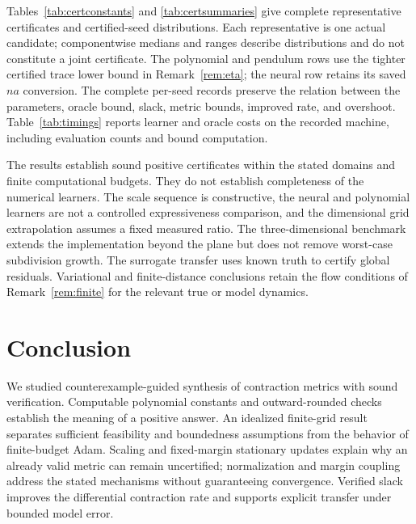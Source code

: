 \documentclass[12pt,onecolumn,journal]{IEEEtran}
\begin{document}
Tables~\ref{tab:certconstants} and \ref{tab:certsummaries} give complete representative certificates and certified-seed distributions. Each representative is one actual candidate; componentwise medians and ranges describe distributions and do not constitute a joint certificate. The polynomial and pendulum rows use the tighter certified trace lower bound in Remark~\ref{rem:eta}; the neural row retains its saved $na$ conversion. The complete per-seed records preserve the relation between the parameters, oracle bound, slack, metric bounds, improved rate, and overshoot. Table~\ref{tab:timings} reports learner and oracle costs on the recorded machine, including evaluation counts and bound computation.

The results establish sound positive certificates within the stated domains and finite computational budgets. They do not establish completeness of the numerical learners. The scale sequence is constructive, the neural and polynomial learners are not a controlled expressiveness comparison, and the dimensional grid extrapolation assumes a fixed measured ratio. The three-dimensional benchmark extends the implementation beyond the plane but does not remove worst-case subdivision growth. The surrogate transfer uses known truth to certify global residuals. Variational and finite-distance conclusions retain the flow conditions of Remark~\ref{rem:finite} for the relevant true or model dynamics.

\FloatBarrier
\begingroup
\makeatletter
\renewenvironment{table}[1][]{%
  \par\addvspace{\intextsep}\noindent
  \begin{minipage}{\linewidth}\def\@captype{table}%
}{%
  \end{minipage}\par\addvspace{\intextsep}%
}
\makeatother
{}
\endgroup

\FloatBarrier
\section{Conclusion}
\label{sec:conclusion}

We studied counterexample-guided synthesis of contraction metrics with sound verification. Computable polynomial constants and outward-rounded checks establish the meaning of a positive answer. An idealized finite-grid result separates sufficient feasibility and boundedness assumptions from the behavior of finite-budget Adam. Scaling and fixed-margin stationary updates explain why an already valid metric can remain uncertified; normalization and margin coupling address the stated mechanisms without guaranteeing convergence. Verified slack improves the differential contraction rate and supports explicit transfer under bounded model error.
\end{document}
